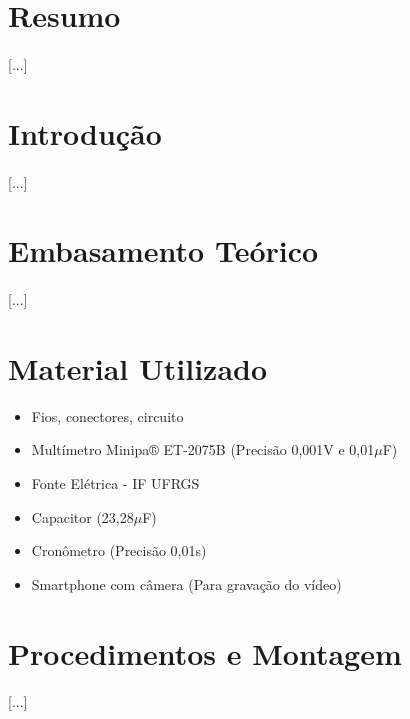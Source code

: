 \documentclass[column,brazilian,12pt,a4paper,final]{article}
\title{}
\author{Autores: \\ Lucas Assis Paulino da Silva - 590174 \\Lucas Bertazo de Deus Félix - 587064
 \\ Pedro Henrique Reis de Oliveira - 590908 \\ IF-UFRGS}
\date{Abril 2025}
\begin{document}
\maketitle
\thispagestyle{fancy}

\section*{Resumo}
\paragraph{}
[...]

\section{Introdução}
\paragraph{}
[...]

\section{Embasamento Teórico}
\paragraph{}
[...]

\section{Material Utilizado}
\begin{itemize}
    \item Fios, conectores, circuito
    \item Multímetro Minipa® ET-2075B (Precisão 0,001V e 0,01$\mu$F)
    \item Fonte Elétrica - IF UFRGS
    \item Capacitor (23,28$\mu$F)
    \item Cronômetro (Precisão 0,01s)
    \item Smartphone com câmera (Para gravação do vídeo)
\end{itemize}

\section{Procedimentos e Montagem}
\paragraph{}
[...]
\end{document}
